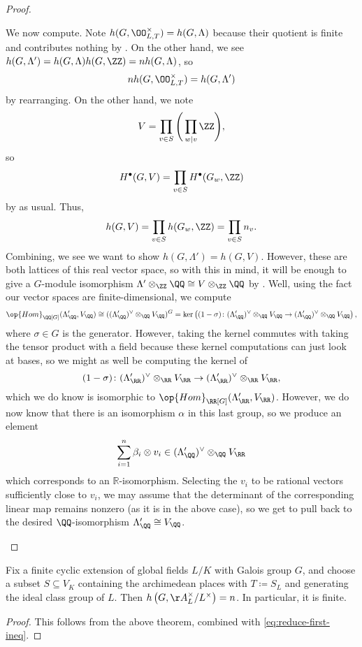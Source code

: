 \documentclass[../notes.tex]{subfiles}
\begin{document}
\begin{proof}
\begin{listalph}
		We now compute. Note $h(G,\OO_{L,T}^\times)=h(G,\Lambda)$ because their quotient is finite and contributes nothing by . On the other hand, we see $h(G,\Lambda')=h(G,\Lambda)h(G,\ZZ)=nh(G,\Lambda)$, so
		\[nh(G,\OO_{L,T}^\times)=h(G,\Lambda')\]
		by rearranging. On the other hand, we note
		\[V=\prod_{v\in S}\Bigg(\prod_{w\mid v}\ZZ\Bigg),\]
		so
		\[H^\bullet(G,V)=\prod_{v\in S}H^\bullet(G_w,\ZZ)\]
		by  as usual. Thus,
		\[h(G,V)=\prod_{v\in S}h(G_w,\ZZ)=\prod_{v\in S}n_v.\]
		Combining, we see we want to show $h(G,\Lambda')=h(G,V)$. However, these are both lattices of this real vector space, so with this in mind, it will be enough to give a $G$-module isomorphism $\Lambda'\otimes_\ZZ\QQ\cong V\otimes_\ZZ\QQ$ by . Well, using the fact our vector spaces are finite-dimensional, we compute
		\[\op{Hom}_{\QQ[G]}(\Lambda_\QQ',V_\QQ)\cong((\Lambda'_\QQ)^\lor\otimes_\QQ V_\QQ)^G=\ker\left((1-\sigma)\colon(\Lambda'_\QQ)^\lor\otimes_\QQ V_\QQ\to(\Lambda'_\QQ)^\lor\otimes_\QQ V_\QQ\right),\]
		where $\sigma\in G$ is the generator. However, taking the kernel commutes with taking the tensor product with a field because these kernel computations can just look at bases, so we might as well be computing the kernel of
		\[(1-\sigma)\colon(\Lambda'_\RR)^\lor\otimes_\RR V_\RR\to(\Lambda'_\RR)^\lor\otimes_\RR V_\RR,\]
		which we do know is isomorphic to $\op{Hom}_{\RR[G]}(\Lambda'_\RR,V_\RR)$. However, we do now know that there is an isomorphism $\alpha$ in this last group, so we produce an element
		\[\sum_{i=1}^n\beta_i\otimes v_i\in(\Lambda_\QQ')^\lor\otimes_\QQ V_\RR\]
		which corresponds to an $\mathbb R$-isomorphism. Selecting the $v_i$ to be rational vectors sufficiently close to $v_i$, we may assume that the determinant of the corresponding linear map remains nonzero (as it is in the above case), so we get to pull back to the desired $\QQ$-isomorphism $\Lambda'_\QQ\cong V_\QQ$.
		\qedhere
	\end{listalph}
\end{proof}
\begin{corollary}
	Fix a finite cyclic extension of global fields $L/K$ with Galois group $G$, and choose a subset $S\subseteq V_K$ containing the archimedean places with $T\coloneqq S_L$ and generating the ideal class group of $L$. Then $h\left(G,\AA_L^\times/L^\times\right)=n$. In particular, it is finite.
\end{corollary}
\begin{proof}
	This follows from the above theorem, combined with \eqref{eq:reduce-first-ineq}.
\end{proof}
\end{document}
